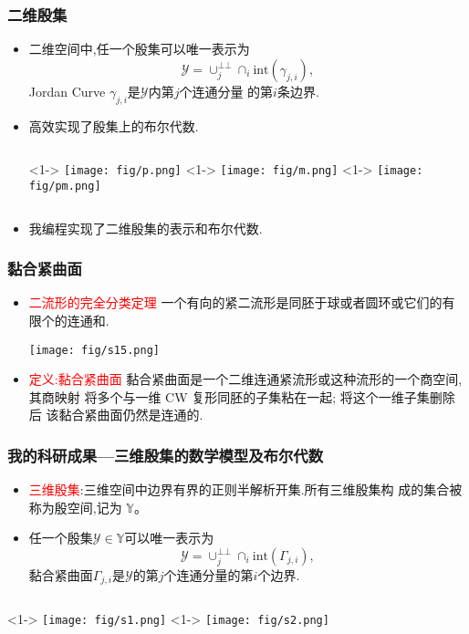 \documentclass[UTF8]{ctexbeamer}	%
\theoremstyle{plain}
\theoremstyle{definition}
\theoremstyle{remark}
\numberwithin{equation}{section}
\begin{document}
\begin{frame}
    \frametitle{二维殷集}
    \begin{itemize}
        \item 二维空间中,任一个殷集可以唯一表示为
        \[\mathcal{Y} = \cup_j^{\bot \bot}\cap_i \text{int}(\gamma_{j, i} ),\]
        Jordan Curve $\gamma_{j, i}$是$\mathcal{Y}$内第$j$个连通分量
        的第$i$条边界.
        \item 高效实现了殷集上的布尔代数. 
        \begin{columns}
            <1->
                \texttt{[image: fig/p.png]}
            <1->
            \texttt{[image: fig/m.png]}
            <1->
            \texttt{[image: fig/pm.png]}
        \end{columns}
        \item 我编程实现了二维殷集的表示和布尔代数.
    \end{itemize}
\end{frame}

\begin{frame}
    \frametitle{黏合紧曲面}
    \begin{itemize}
        \item 
    \textcolor{red}{二流形的完全分类定理} \newline 
    一个有向的紧二流形是同胚于球或者圆环或它们的有限个的连通和.
    \begin{center}
        \texttt{[image: fig/s15.png]}
    \end{center}
    \item
    \textcolor{red}{定义:黏合紧曲面} \newline 
    黏合紧曲面是一个二维连通紧流形或这种流形的一个商空间, 其商映射
    将多个与一维 CW 复形同胚的子集粘在一起; 将这个一维子集删除后
    该黏合紧曲面仍然是连通的.
\end{itemize}
\end{frame}

\begin{frame}
    \frametitle{我的科研成果---三维殷集的数学模型及布尔代数}
    \begin{itemize}
        \item \textcolor{red}{三维殷集}:三维空间中边界有界的正则半解析开集.所有三维殷集构
        成的集合被称为殷空间,记为 $\mathbb{Y}$。
        \item 任一个殷集$\mathcal{Y} \in \mathbb{Y}$可以唯一表示为
        \[\mathcal{Y} = \cup_j^{\bot \bot} \cap_i \text{int}(\Gamma_{j, i}),\]
        黏合紧曲面$\Gamma_{j, i}$是$\mathcal{Y}$的第$j$个连通分量的第$i$个边界.
    \end{itemize}
    \begin{columns}
        <1->
            \texttt{[image: fig/s1.png]}
        <1->
        \texttt{[image: fig/s2.png]}
    \end{columns}
\end{frame}
\end{document}
